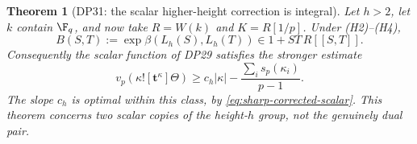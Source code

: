 \documentclass[11pt,a4paper]{article}
\newtheorem{theorem}{Theorem}[section]
\theoremstyle{definition}\newtheorem{remark}[theorem]{Remark}
\begin{document}
\begin{theorem}[DP31: the scalar higher-height correction is integral]\label{DP31}
Let $h>2$, let $k$ contain $\F_q$, and now take $R=W(k)$ and $K=R[1/p]$. Under (H2)--(H4),
\begin{equation}\label{eq:scalar-gauge}
 B(S,T):=\exp\beta(L_h(S),L_h(T))\in1+ST\,R[[S,T]].
\end{equation}
Consequently the scalar function of DP29 satisfies the stronger estimate
\begin{equation}\label{eq:scalar-full-slope}
 v_p(\kappa![\mathbf t^\kappa]\Theta)
 \ge c_h|\kappa|-\frac{\sum_i s_p(\kappa_i)}{p-1}.
\end{equation}
The slope $c_h$ is optimal within this class, by \eqref{eq:sharp-corrected-scalar}. This theorem concerns two scalar copies of the height-$h$ group, not the genuinely dual pair.
\end{theorem}
\end{document}
